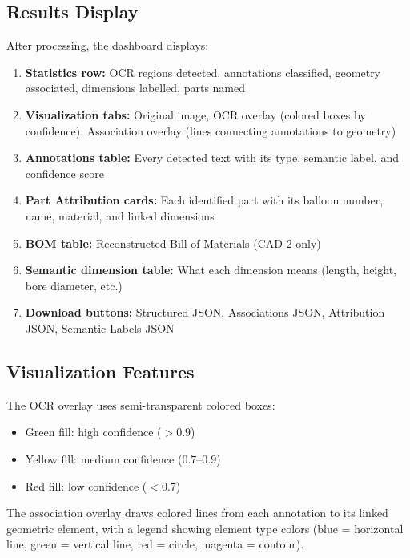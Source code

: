 \documentclass[12pt,a4paper]{article}
\begin{document}
\subsection{Results Display}

After processing, the dashboard displays:
\begin{enumerate}[noitemsep]
    \item \textbf{Statistics row:} OCR regions detected, annotations classified, geometry associated, dimensions labelled, parts named
    \item \textbf{Visualization tabs:} Original image, OCR overlay (colored boxes by confidence), Association overlay (lines connecting annotations to geometry)
    \item \textbf{Annotations table:} Every detected text with its type, semantic label, and confidence score
    \item \textbf{Part Attribution cards:} Each identified part with its balloon number, name, material, and linked dimensions
    \item \textbf{BOM table:} Reconstructed Bill of Materials (CAD 2 only)
    \item \textbf{Semantic dimension table:} What each dimension means (length, height, bore diameter, etc.)
    \item \textbf{Download buttons:} Structured JSON, Associations JSON, Attribution JSON, Semantic Labels JSON
\end{enumerate}

\subsection{Visualization Features}

The OCR overlay uses semi-transparent colored boxes:
\begin{itemize}[noitemsep]
    \item Green fill: high confidence ($>0.9$)
    \item Yellow fill: medium confidence ($0.7$--$0.9$)
    \item Red fill: low confidence ($<0.7$)
\end{itemize}

The association overlay draws colored lines from each annotation to its linked geometric element, with a legend showing element type colors (blue = horizontal line, green = vertical line, red = circle, magenta = contour).

\end{document}
